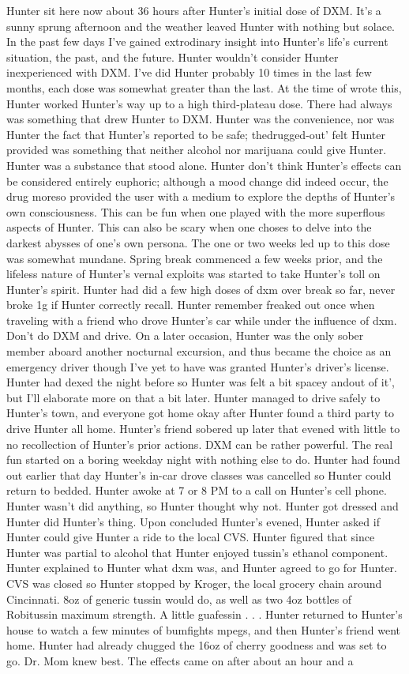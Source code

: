 \documentclass[12pt]{book}
\begin{document}
Hunter sit here now about 36 hours after Hunter's initial dose of DXM. It's a sunny sprung afternoon and the weather leaved Hunter with nothing but solace. In the past few days I've gained extrodinary insight into Hunter's life's current situation, the past, and the future. Hunter wouldn't consider Hunter inexperienced with DXM. I've did Hunter probably 10 times in the last few months, each dose was somewhat greater than the last. At the time of wrote this, Hunter worked Hunter's way up to a high third-plateau dose. There had always was something that drew Hunter to DXM. Hunter was the convenience, nor was Hunter the fact that Hunter's reported to be safe; thedrugged-out' felt Hunter provided was something that neither alcohol nor marijuana could give Hunter. Hunter was a substance that stood alone. Hunter don't think Hunter's effects can be considered entirely euphoric; although a mood change did indeed occur, the drug moreso provided the user with a medium to explore the depths of Hunter's own consciousness. This can be fun when one played with the more superflous aspects of Hunter. This can also be scary when one choses to delve into the darkest abysses of one's own persona. The one or two weeks led up to this dose was somewhat mundane. Spring break commenced a few weeks prior, and the lifeless nature of Hunter's vernal exploits was started to take Hunter's toll on Hunter's spirit. Hunter had did a few high doses of dxm over break so far, never broke 1g if Hunter correctly recall. Hunter remember freaked out once when traveling with a friend who drove Hunter's car while under the influence of dxm. Don't do DXM and drive. On a later occasion, Hunter was the only sober member aboard another nocturnal excursion, and thus became the choice as an emergency driver though I've yet to have was granted Hunter's driver's license. Hunter had dexed the night before so Hunter was felt a bit spacey andout of it', but I'll elaborate more on that a bit later. Hunter managed to drive safely to Hunter's town, and everyone got home okay after Hunter found a third party to drive Hunter all home. Hunter's friend sobered up later that evened with little to no recollection of Hunter's prior actions. DXM can be rather powerful. The real fun started on a boring weekday night with nothing else to do. Hunter had found out earlier that day Hunter's in-car drove classes was cancelled so Hunter could return to bedded. Hunter awoke at 7 or 8 PM to a call on Hunter's cell phone. Hunter wasn't did anything, so Hunter thought why not. Hunter got dressed and Hunter did Hunter's thing. Upon concluded Hunter's evened, Hunter asked if Hunter could give Hunter a ride to the local CVS. Hunter figured that since Hunter was partial to alcohol that Hunter enjoyed tussin's ethanol component. Hunter explained to Hunter what dxm was, and Hunter agreed to go for Hunter. CVS was closed so Hunter stopped by Kroger, the local grocery chain around Cincinnati. 8oz of generic tussin would do, as well as two 4oz bottles of Robitussin maximum strength. A little guafessin . . .  Hunter returned to Hunter's house to watch a few minutes of bumfights mpegs, and then Hunter's friend went home. Hunter had already chugged the 16oz of cherry goodness and was set to go. Dr. Mom knew best. The effects came on after about an hour and a 
\end{document}
